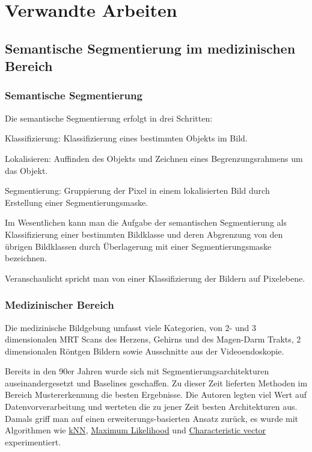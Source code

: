 \newcommand{\source}[1]{\caption*{Source: {#1}} }

\section{Verwandte Arbeiten}\raggedbottom

\subsection{Semantische Segmentierung im medizinischen Bereich}

\subsubsection{Semantische Segmentierung}

Die semantische Segmentierung erfolgt in drei Schritten:

Klassifizierung: Klassifizierung eines bestimmten Objekts im Bild.

Lokalisieren: Auffinden des Objekts und Zeichnen eines Begrenzungsrahmens um das Objekt.

Segmentierung: Gruppierung der Pixel in einem lokalisierten Bild durch Erstellung einer Segmentierungsmaske.

Im Wesentlichen kann man die Aufgabe der semantischen Segmentierung als Klassifizierung einer bestimmten Bildklasse und deren Abgrenzung von den übrigen Bildklassen durch Überlagerung mit einer Segmentierungsmaske bezeichnen.

Veranschaulicht spricht man von einer Klassifizierung der Bildern auf Pixelebene.

\subsubsection{Medizinischer Bereich}

Die medizinische Bildgebung umfasst viele Kategorien, von 2- und 3 dimensionalen MRT Scans des Herzens, Gehirns und des Magen-Darm Trakts, 2 dimensionalen Röntgen Bildern sowie Ausschnitte aus der Videoendoskopie.

Bereits in den 90er Jahren wurde sich mit Segmentierungsarchitekturen auseinandergesetzt und Baselines geschaffen. Zu dieser Zeit lieferten Methoden im Bereich Mustererkennung die besten Ergebnisse. Die Autoren legten viel Wert auf Datenvorverarbeitung und werteten die zu jener Zeit besten Architekturen aus. Damals griff man auf einen erweiterungs-basierten Ansatz zurück, es wurde mit Algorithmen wie
\href{https://en.wikipedia.org/wiki/K-nearest_neighbors_algorithm}{kNN},
\href{https://en.wikipedia.org/wiki/Maximum_likelihood_estimation}{Maximum Likelihood} und
\href{https://en.wikipedia.org/wiki/Eigenvalues_and_eigenvectors}{Characteristic vector} experimentiert.

